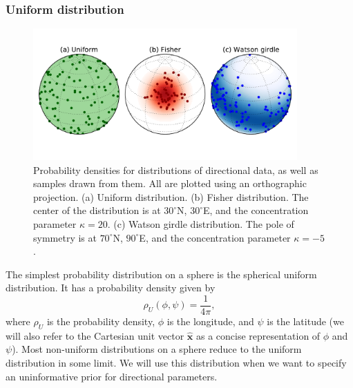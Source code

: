 \documentclass[preprint,12pt,authoryear]{elsarticle}
\begin{document}
\subsubsection{Uniform distribution}
\begin{figure}
\includegraphics[width=0.9\textwidth]{figures/cartoon/distributions.pdf}
\caption[Spherical probability distributions.]{Probability densities for distributions of directional data, as well as samples drawn from them. All are plotted using an orthographic projection. (a) Uniform distribution. (b) Fisher distribution. The center of the distribution is at $30^\circ$N, $30^\circ$E, and the concentration parameter $\kappa=20$. (c) Watson girdle distribution. The pole of symmetry is at $70^\circ$N, $90^\circ$E, and the concentration parameter $\kappa=-5$.}
\label{fig:distributions}
\end{figure}

The simplest probability distribution on a sphere is the spherical uniform distribution.
It has a probability density given by
\begin{equation}
  \rho_U(\phi, \psi) = \frac{1}{4 \pi},
\end{equation}
where $\rho_U$ is the probability density, $\phi$ is the longitude, and $\psi$ is the latitude
(we will also refer to the Cartesian unit vector $\hat{\mathbf{x}}$ as a concise representation of $\phi$ and $\psi$).
Most non-uniform distributions on a sphere reduce to the uniform distribution in some limit.
We will use this distribution when we want to specify an uninformative prior for directional parameters.
\end{document}
